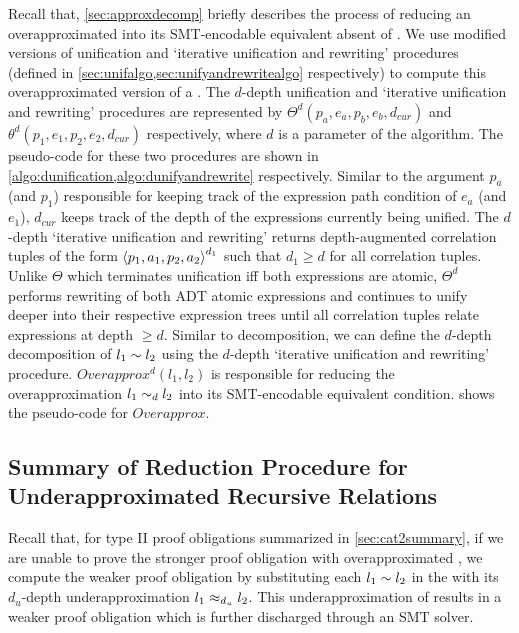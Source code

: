 Recall that, \cref{sec:approxdecomp} briefly describes the process of reducing an
overapproximated \recursiveRelation{} into its SMT-encodable equivalent absent
of \recursiveRelations{}.
We use modified versions of unification and `iterative unification and rewriting' procedures
(defined in \cref{sec:unifalgo,sec:unifyandrewritealgo} respectively)
to compute this overapproximated version of a \recursiveRelation{}.
The $d$-depth unification and `iterative unification and rewriting' procedures
are represented by $\Theta^{d}(p_a,e_a,p_b,e_b,d_{cur})$ and $\theta^{d}(p_1,e_1,p_2,e_2,d_{cur})$
respectively, where $d$ is a parameter of the algorithm.
The pseudo-code for these two procedures are shown in \cref{algo:dunification,algo:dunifyandrewrite} respectively.
Similar to the argument $p_a$ (and $p_1$) responsible for keeping track of the expression
path condition of $e_a$ (and $e_1$), $d_{cur}$ keeps track of the depth of the expressions
currently being unified.
The $d$-depth `iterative unification and rewriting' returns depth-augmented
correlation tuples of the form ${\langle p_1, a_1, p_2, a_2 \rangle}^{d_1}$ such that $d_1 \geq d$
for all correlation tuples.
Unlike $\Theta$ which terminates unification iff both expressions are atomic,
$\Theta^{d}$ performs rewriting of both ADT atomic expressions and continues to
unify deeper into their respective expression trees until all correlation tuples relate
expressions at depth $\geq d$.
Similar to decomposition, we can define the $d$-depth decomposition of $l_1 \sim{} l_2$
using the $d$-depth `iterative unification and rewriting' procedure.
$Overapprox^{d}(l_1,l_2)$ is responsible for reducing the overapproximation $l_1 \sim_{d} l_2$
into its SMT-encodable equivalent condition.
 shows the pseudo-code for $Overapprox$.





\subsection{Summary of Reduction Procedure for Underapproximated Recursive Relations}
\label{sec:underapproxalgo}
Recall that, for type II proof obligations summarized in \cref{sec:cat2summary},
if we are unable to prove the stronger proof obligation with overapproximated \lhs{},
we compute the weaker proof obligation by substituting each \recursiveRelation{} $l_1 \sim{} l_2$ in the \lhs{}
with its $d_u$-depth underapproximation $l_1 \approx_{d_u} l_2$.
This underapproximation of \lhs{} results in a weaker proof obligation which is further
discharged through an SMT solver.

